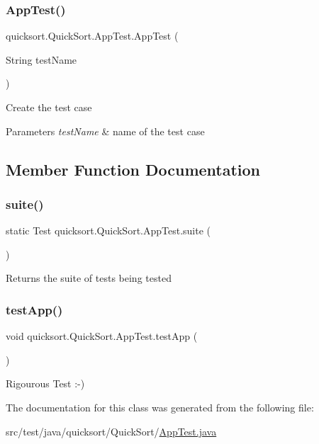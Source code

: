 \subsubsection{\texorpdfstring{App\+Test()}{AppTest()}}
{\footnotesize\ttfamily quicksort.\+Quick\+Sort.\+App\+Test.\+App\+Test (\begin{DoxyParamCaption}\item[{String}]{test\+Name }\end{DoxyParamCaption})}

Create the test case


\begin{DoxyParams}{Parameters}
{\em test\+Name} & name of the test case \\
\hline
\end{DoxyParams}


\subsection{Member Function Documentation}
\hypertarget{classquicksort_1_1_quick_sort_1_1_app_test_a755a777fe26867089c5837bcd43e5c66}{}\label{classquicksort_1_1_quick_sort_1_1_app_test_a755a777fe26867089c5837bcd43e5c66} 
\subsubsection{\texorpdfstring{suite()}{suite()}}
{\footnotesize\ttfamily static Test quicksort.\+Quick\+Sort.\+App\+Test.\+suite (\begin{DoxyParamCaption}{ }\end{DoxyParamCaption})\hspace{0.3cm}{\ttfamily [static]}}

\begin{DoxyReturn}{Returns}
the suite of tests being tested 
\end{DoxyReturn}
\hypertarget{classquicksort_1_1_quick_sort_1_1_app_test_ae2281094b08e5122fd4426edaf856294}{}\label{classquicksort_1_1_quick_sort_1_1_app_test_ae2281094b08e5122fd4426edaf856294} 
\subsubsection{\texorpdfstring{test\+App()}{testApp()}}
{\footnotesize\ttfamily void quicksort.\+Quick\+Sort.\+App\+Test.\+test\+App (\begin{DoxyParamCaption}{ }\end{DoxyParamCaption})}

Rigourous Test \+:-\/) 

The documentation for this class was generated from the following file\+:\begin{DoxyCompactItemize}
\item 
src/test/java/quicksort/\+Quick\+Sort/\hyperlink{_app_test_8java}{App\+Test.\+java}\end{DoxyCompactItemize}
